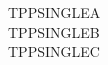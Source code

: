 \documentclass{abntexto-ufc}
\begin{document}
\ufcPrintTitlePage

\thispagestyle{empty}
\begingroup
\singlesp
\noindent TPPSINGLEA\\
TPPSINGLEB\\
TPPSINGLEC
\par
\endgroup
\end{document}
